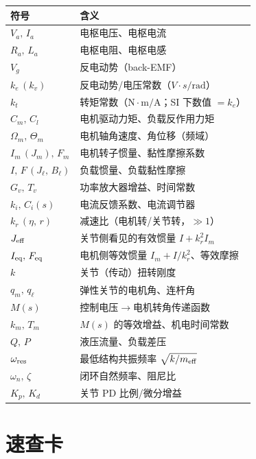 \begin{center}
\begin{longtable}{ll}
\toprule
符号 & 含义 \\
\midrule
\endhead
$V_a,\,I_a$ & 电枢电压、电枢电流 \\
$R_a,\,L_a$ & 电枢电阻、电枢电感 \\
$V_g$ & 反电动势（back-EMF） \\
$k_e\,(k_v)$ & 反电动势/电压常数（$V\!\cdot\! s/\mathrm{rad}$） \\
$k_t$ & 转矩常数（$\mathrm{N\!\cdot\! m/A}$；SI 下数值 $=k_e$） \\
$C_m,\,C_l$ & 电机驱动力矩、负载反作用力矩 \\
$\Omega_m,\,\Theta_m$ & 电机轴角速度、角位移（频域） \\
$I_m\,(J_m),\,F_m$ & 电机转子惯量、黏性摩擦系数 \\
$I,\,F\,(J_\ell,\,B_\ell)$ & 负载惯量、负载黏性摩擦 \\
$G_v,\,T_v$ & 功率放大器增益、时间常数 \\
$k_i,\,C_i(s)$ & 电流反馈系数、电流调节器 \\
$k_r\,(\eta,\,r)$ & 减速比（电机转/关节转，$\gg1$） \\
$J_{\rm eff}$ & 关节侧看见的有效惯量 $I+k_r^2 I_m$ \\
$I_{\rm eq},\,F_{\rm eq}$ & 电机侧等效惯量 $I_m+I/k_r^2$、等效摩擦 \\
$k$ & 关节（传动）扭转刚度 \\
$q_m,\,q_\ell$ & 弹性关节的电机角、连杆角 \\
$M(s)$ & 控制电压$\to$电机转角传递函数 \\
$k_m,\,T_m$ & $M(s)$ 的等效增益、机电时间常数 \\
$Q,\,P$ & 液压流量、负载差压 \\
$\omega_{\rm res}$ & 最低结构共振频率 $\sqrt{k/m_{\rm eff}}$ \\
$\omega_n,\,\zeta$ & 闭环自然频率、阻尼比 \\
$K_p,\,K_d$ & 关节 PD 比例/微分增益 \\
\bottomrule
\end{longtable}
\end{center}

\section{速查卡}
\label{sec:ds-cheatsheet}

